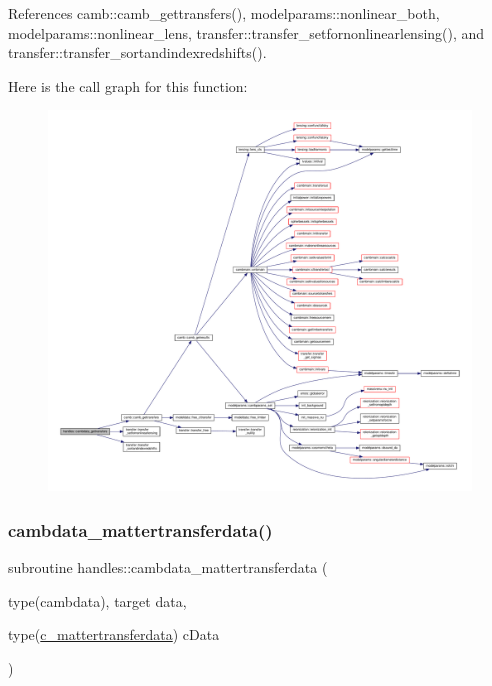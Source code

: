 References camb\+::camb\+\_\+gettransfers(), modelparams\+::nonlinear\+\_\+both, modelparams\+::nonlinear\+\_\+lens, transfer\+::transfer\+\_\+setfornonlinearlensing(), and transfer\+::transfer\+\_\+sortandindexredshifts().

Here is the call graph for this function\+:
\nopagebreak
\begin{figure}[H]
\begin{center}
\leavevmode
\includegraphics[width=350pt]{namespacehandles_a386ee0a28e6860d14047f052c918ca43_cgraph}
\end{center}
\end{figure}
\mbox{\label{namespacehandles_a98c230a0efe726b878c7efc4e95f6574}} 
\subsubsection{\texorpdfstring{cambdata\+\_\+mattertransferdata()}{cambdata\_mattertransferdata()}}
{\footnotesize\ttfamily subroutine handles\+::cambdata\+\_\+mattertransferdata (\begin{DoxyParamCaption}\item[{type(cambdata), target}]{data,  }\item[{type(\mbox{\hyperlink{structhandles_1_1c__mattertransferdata}{c\+\_\+mattertransferdata}})}]{c\+Data }\end{DoxyParamCaption})}

